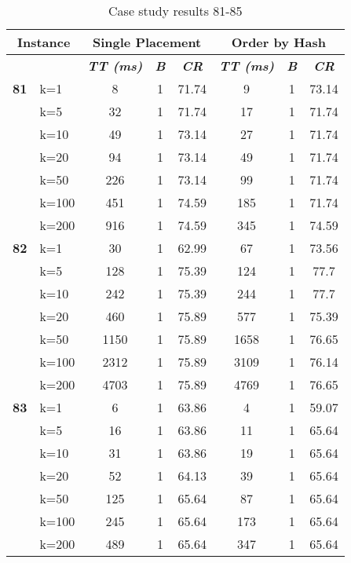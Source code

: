     \begin{table}[htbp]
    \caption{Case study results 81-85}
    \centering
    \begin{tabular}{|l|l|c|c|c|c|c|c|}
    \hline
    \multicolumn{ 2}{|c|}{\textbf{Instance}} & \multicolumn{ 3}{c|}{\textbf{Single Placement}} & \multicolumn{ 3}{c|}{\textbf{Order by Hash}} \\ \hline
    \multicolumn{ 2}{|l|}{} & \textbf{\textit{TT (ms)}} & \textbf{\textit{B}} & \textbf{\textit{CR}} & \textbf{\textit{TT (ms)}} & \textbf{\textit{B}} & \textbf{\textit{CR}} \\ \hline
    \multicolumn{1}{|r|}{\textbf{81}} & k=1 & 8 & 1 & 71.74 & 9 & 1 & 73.14 \\ 
     & k=5 & 32 & 1 & 71.74 & 17 & 1 & 71.74 \\ 
     & k=10 & 49 & 1 & 73.14 & 27 & 1 & 71.74 \\ 
     & k=20 & 94 & 1 & 73.14 & 49 & 1 & 71.74 \\ 
     & k=50 & 226 & 1 & 73.14 & 99 & 1 & 71.74 \\ 
     & k=100 & 451 & 1 & 74.59 & 185 & 1 & 71.74 \\ 
     & k=200 & 916 & 1 & 74.59 & 345 & 1 & 74.59 \\ \hline
    \multicolumn{1}{|r|}{\textbf{82}} & k=1 & 30 & 1 & 62.99 & 67 & 1 & 73.56 \\ 
     & k=5 & 128 & 1 & 75.39 & 124 & 1 & 77.7 \\ 
     & k=10 & 242 & 1 & 75.39 & 244 & 1 & 77.7 \\ 
     & k=20 & 460 & 1 & 75.89 & 577 & 1 & 75.39 \\ 
     & k=50 & 1150 & 1 & 75.89 & 1658 & 1 & 76.65 \\ 
     & k=100 & 2312 & 1 & 75.89 & 3109 & 1 & 76.14 \\ 
     & k=200 & 4703 & 1 & 75.89 & 4769 & 1 & 76.65 \\ \hline
    \multicolumn{1}{|r|}{\textbf{83}} & k=1 & 6 & 1 & 63.86 & 4 & 1 & 59.07 \\ 
     & k=5 & 16 & 1 & 63.86 & 11 & 1 & 65.64 \\ 
     & k=10 & 31 & 1 & 63.86 & 19 & 1 & 65.64 \\ 
     & k=20 & 52 & 1 & 64.13 & 39 & 1 & 65.64 \\ 
     & k=50 & 125 & 1 & 65.64 & 87 & 1 & 65.64 \\ 
     & k=100 & 245 & 1 & 65.64 & 173 & 1 & 65.64 \\ 
     & k=200 & 489 & 1 & 65.64 & 347 & 1 & 65.64 \\ \hline

\end{tabular}
\end{table}
